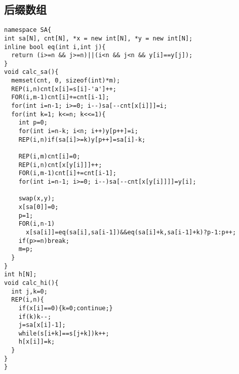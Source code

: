 \subsection{后缀数组}
\begin{lstlisting}
namespace SA{
int sa[N], cnt[N], *x = new int[N], *y = new int[N];
inline bool eq(int i,int j){
  return (i>=n && j>=n)||(i<n && j<n && y[i]==y[j]);
}
void calc_sa(){
  memset(cnt, 0, sizeof(int)*m);
  REP(i,n)cnt[x[i]=s[i]-'a']++;
  FOR(i,m-1)cnt[i]+=cnt[i-1];
  for(int i=n-1; i>=0; i--)sa[--cnt[x[i]]]=i;
  for(int k=1; k<=n; k<<=1){
    int p=0;
    for(int i=n-k; i<n; i++)y[p++]=i;
    REP(i,n)if(sa[i]>=k)y[p++]=sa[i]-k;

    REP(i,m)cnt[i]=0;
    REP(i,n)cnt[x[y[i]]]++;
    FOR(i,m-1)cnt[i]+=cnt[i-1];
    for(int i=n-1; i>=0; i--)sa[--cnt[x[y[i]]]]=y[i];

    swap(x,y);
    x[sa[0]]=0;
    p=1;
    FOR(i,n-1)
      x[sa[i]]=eq(sa[i],sa[i-1])&&eq(sa[i]+k,sa[i-1]+k)?p-1:p++;
    if(p>=n)break;
    m=p;
  }
}
int h[N];
void calc_hi(){
  int j,k=0;
  REP(i,n){
    if(x[i]==0){k=0;continue;}
    if(k)k--;
    j=sa[x[i]-1];
    while(s[i+k]==s[j+k])k++;
    h[x[i]]=k;
  }
}
}
\end{lstlisting}
